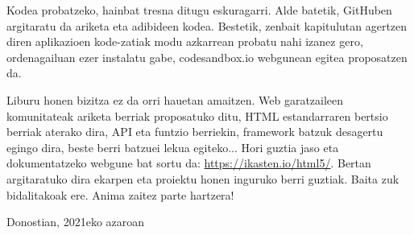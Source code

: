 \clearpage
\thispagestyle{empty}

Kodea probatzeko, hainbat tresna ditugu eskuragarri. Alde batetik, GitHuben argitaratu da ariketa eta adibideen kodea. Bestetik, zenbait kapitulutan agertzen diren aplikazioen kode-zatiak modu azkarrean probatu nahi izanez gero, ordenagailuan ezer instalatu gabe, codesandbox.io webgunean egitea proposatzen da.

Liburu honen bizitza ez da orri hauetan amaitzen. Web garatzaileen komunitateak ariketa berriak proposatuko ditu, HTML estandarraren bertsio berriak aterako dira, API eta funtzio berriekin, framework batzuk desagertu egingo dira, beste berri batzuei lekua egiteko... Hori guztia jaso eta dokumentatzeko webgune bat sortu da: \href{https://ikasten.io/html5/}{https://ikasten.io/html5/}.
Bertan argitaratuko dira ekarpen eta proiektu honen inguruko berri guztiak. Baita zuk bidalitakoak ere. Anima zaitez parte hartzera!\\

\begin{flushright}
Donostian, 2021eko azaroan
\end{flushright}
